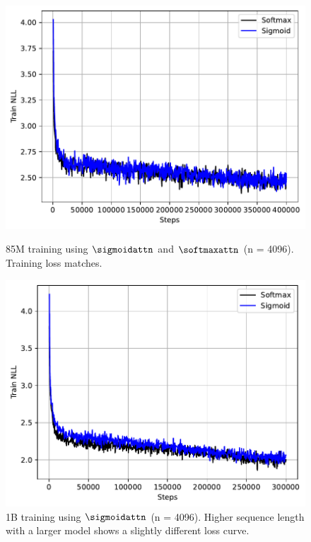 \begin{figure}[H]
    \centering
    \begin{minipage}{0.46\textwidth}
        \footnotesize
        \centering
        \includegraphics[trim={0 0 0 0}, width=\textwidth]{
            figures/llm/85m_nll.pdf
        }
        \captionsetup{justification=centering}
        \caption{
            85M training using $\sigmoidattn$ and $\softmaxattn$ (n = 4096). Training loss matches.
        }
        \label{fig:85m_4k_nll}
    \end{minipage}
    \hfill
    \begin{minipage}{0.46\textwidth}
        \centering        
        \includegraphics[trim={0 0 0 0}, width=\textwidth]{
            figures/llm/1b_nll.pdf
        }
        \captionsetup{justification=centering} 
        \caption{1B training using $\sigmoidattn$ (n = 4096). Higher sequence length with a larger model shows a slightly different loss curve.}
        \label{fig:1b_4k_nll}
    \end{minipage}
\end{figure}
